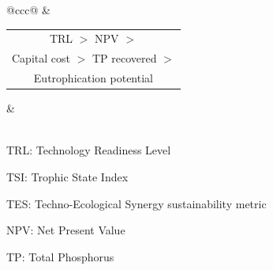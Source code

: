 \begin{refsection}[referencesCh4]
\begin{table}[p]
{\begin{threeparttable}
\begin{tabular}{@{}ccc@{}}
			      & \begin{tabular}[c]{@{}c@{}}TRL $>$ NPV $>$ \\ Capital cost $>$ TP recovered $>$ \\ Eutrophication potential\end{tabular}  &                                                      \\  \\ \bottomrule
		\end{tabular}
		\begin{tablenotes}
			\item TRL: Technology Readiness Level
			\item TSI: Trophic State Index
			\item TES: Techno-Ecological Synergy sustainability metric
			\item NPV: Net Present Value
			\item TP: Total Phosphorus
		\end{tablenotes}
	\end{threeparttable}
	}
\end{table}


\end{refsection}
